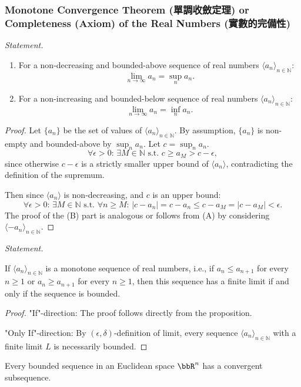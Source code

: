 \documentclass[a4paper,12pt]{report}
\begin{document}
\subsubsection{Monotone Convergence Theorem (單調收斂定理) or Completeness (Axiom) of the Real Numbers (實數的完備性)}
\textit{Statement.}
\begin{enumerate}[label=(\Alph*)]
\item For a non-decreasing and bounded-above sequence of real numbers $\langle a_n\rangle_{n\in\mathbb {N}}$:
\[\lim_{n\to\infty}a_n=\sup_n a_n.\]
\item For a non-increasing and bounded-below sequence of real numbers $\langle a_n\rangle_{n\in\mathbb {N}}$:
\[\lim_{n\to\infty}a_n=\inf_n a_n.\]
\end{enumerate}
\begin{proof}
Let $\{a_{n}\}$ be the set of values of $\langle a_n\rangle_{n\in\mathbb {N}}$. By assumption, $\{a_n\}$ is non-empty and bounded-above by $\sup_n a_n$. Let $c=\sup_n a_n$.
\[\forall\epsilon>0:\,\exists M\in\mathbb {N}\text{\ s.t.\ }c\geq a_M>c-\epsilon,\]
since otherwise $c-\epsilon$ is a strictly smaller upper bound of $\langle a_n\rangle$, contradicting the definition of the supremum. 

Then since $\langle a_n\rangle$ is non-decreasing, and $c$ is an upper bound:
\[\forall\epsilon>0:\,\exists M\in\mathbb {N}\text{\ s.t.\ }\forall n\geq M:\,|c-a_n|=c-a_n\leq c-a_M=|c-a_M|<\epsilon.\]
The proof of the (B) part is analogous or follows from (A) by considering $\langle -a_{n}\rangle_{n\in \mathbb{N}}$.
\end{proof}
\textit{Statement.}

If $\langle a_n\rangle_{n\in\mathbb {N}}$ is a monotone sequence of real numbers, i.e., if 
$a_n\leq a_{n+1}$ for every $n\geq 1$ or $a_n\geq a_{n+1}$ for every $n\geq 1$, then this sequence has a finite limit if and only if the sequence is bounded.
\begin{proof}
"If"-direction: The proof follows directly from the proposition.

"Only If"-direction: By $(\epsilon,\delta)$-definition of limit, every sequence $\langle a_n\rangle_{n\in\mathbb {N}}$ with a finite limit $L$ is necessarily bounded.
\end{proof}
Every bounded sequence in an Euclidean space $\bbR^n$ has a convergent subsequence.
\end{document}
